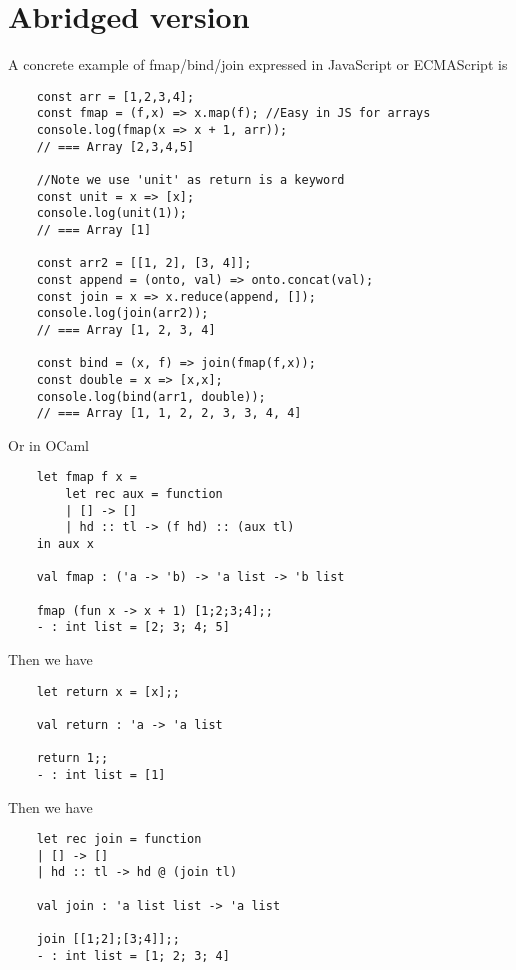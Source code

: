 \section{Abridged version}

A concrete example of fmap/bind/join expressed in JavaScript or ECMAScript is
\begin{verbatim}
    const arr = [1,2,3,4];
    const fmap = (f,x) => x.map(f); //Easy in JS for arrays
    console.log(fmap(x => x + 1, arr));
    // === Array [2,3,4,5]

    //Note we use 'unit' as return is a keyword
    const unit = x => [x];
    console.log(unit(1));
    // === Array [1]

    const arr2 = [[1, 2], [3, 4]];
    const append = (onto, val) => onto.concat(val);
    const join = x => x.reduce(append, []);
    console.log(join(arr2));
    // === Array [1, 2, 3, 4]

    const bind = (x, f) => join(fmap(f,x));
    const double = x => [x,x];
    console.log(bind(arr1, double));
    // === Array [1, 1, 2, 2, 3, 3, 4, 4]
\end{verbatim}

Or in OCaml
\begin{verbatim}
    let fmap f x =
        let rec aux = function
        | [] -> []
        | hd :: tl -> (f hd) :: (aux tl)
    in aux x

    val fmap : ('a -> 'b) -> 'a list -> 'b list

    fmap (fun x -> x + 1) [1;2;3;4];;
    - : int list = [2; 3; 4; 5]

\end{verbatim}
Then we have
\begin{verbatim}
    let return x = [x];;

    val return : 'a -> 'a list

    return 1;;
    - : int list = [1]
\end{verbatim}
Then we have
\begin{verbatim}
    let rec join = function
    | [] -> []
    | hd :: tl -> hd @ (join tl)

    val join : 'a list list -> 'a list

    join [[1;2];[3;4]];;
    - : int list = [1; 2; 3; 4]
\end{verbatim}
